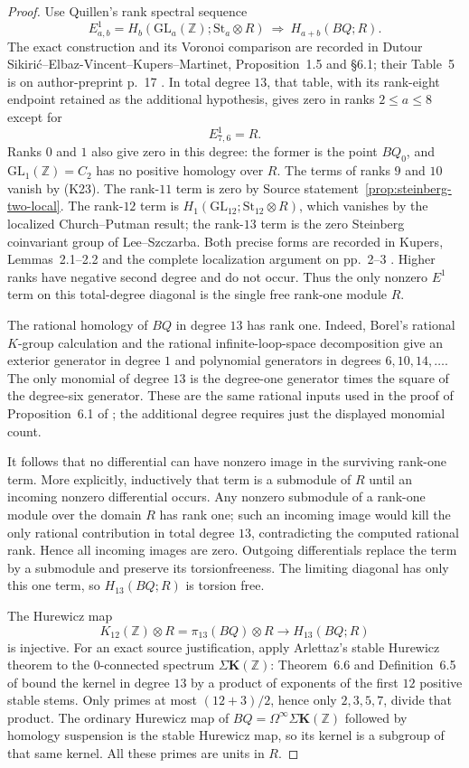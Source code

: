 \documentclass[11pt,a4paper]{article}
\theoremstyle{definition}
\begin{document}
\begin{proof}
Use Quillen's rank spectral sequence
\[
 E^1_{a,b}=H_b(\mathrm{GL}_a(\mathbb Z);\mathrm{St}_a\otimes R)
 \ \Longrightarrow\ H_{a+b}(BQ;R).
\]
The exact construction and its Voronoi comparison are recorded in
Dutour Sikiri\'c--Elbaz-Vincent--Kupers--Martinet,
Proposition~1.5 and \S6.1; their Table~5 is on author-preprint p.~17
\cite{DEKM2026}. In total degree $13$, that table, with its rank-eight endpoint retained
as the additional hypothesis, gives zero in ranks $2\le a\le8$ except for
\[
 E^1_{7,6}=R.
\]
Ranks $0$ and $1$ also give zero in this degree: the former is the
point $BQ_0$, and $\mathrm{GL}_1(\mathbb Z)=C_2$ has no positive
homology over $R$. The terms of ranks $9$ and $10$ vanish by (K23). The rank-$11$
term is zero by Source statement~\ref{prop:steinberg-two-local}.
The rank-$12$ term is $H_1(\mathrm{GL}_{12};\mathrm{St}_{12}\otimes R)$,
which vanishes by the localized Church--Putman result; the rank-$13$
term is the zero Steinberg coinvariant group of Lee--Szczarba.
Both precise forms are recorded in Kupers, Lemmas~2.1--2.2 and the
complete localization argument on pp.~2--3
\cite{Kupers2019}. Higher ranks have negative second degree and do
not occur. Thus the only nonzero $E^1$ term on this total-degree
diagonal is the single free rank-one module $R$.

The rational homology of $BQ$ in degree $13$ has rank one.
Indeed, Borel's rational $K$-group calculation and the rational
infinite-loop-space decomposition give an exterior generator in
degree $1$ and polynomial generators in degrees $6,10,14,\ldots$.
The only monomial of degree $13$ is the degree-one generator times
the square of the degree-six generator. These are the same rational
inputs used in the proof of Proposition~6.1 of
\cite{DEKM2026}; the additional degree requires just the
displayed monomial count.

It follows that no differential can have nonzero image in the
surviving rank-one term. More explicitly, inductively that term is
a submodule of $R$ until an incoming nonzero differential occurs.
Any nonzero submodule of a rank-one module over the domain $R$ has
rank one; such an incoming image would kill the only rational
contribution in total degree $13$, contradicting the computed
rational rank. Hence all incoming images are zero. Outgoing
differentials replace the term by a submodule and preserve its
torsionfreeness. The limiting diagonal has only this one term, so
$H_{13}(BQ;R)$ is torsion free.

The Hurewicz map
\[
 K_{12}(\mathbb Z)\otimes R
   =\pi_{13}(BQ)\otimes R\longrightarrow H_{13}(BQ;R)
\]
is injective. For an exact source justification, apply Arlettaz's
stable Hurewicz theorem to the $0$-connected spectrum
$\Sigma\mathbf K(\mathbb Z)$: Theorem~6.6 and Definition~6.5 of
\cite[pp.~40--42]{Arlettaz2000} bound the kernel in degree $13$
by a product of exponents of the first $12$ positive stable stems.
Only primes at most $(12+3)/2$, hence only $2,3,5,7$, divide that
product. The ordinary Hurewicz map of
$BQ=\Omega^\infty\Sigma\mathbf K(\mathbb Z)$ followed by homology
suspension is the stable Hurewicz map, so its kernel is a subgroup
of that same kernel. All these primes are units in $R$.


\end{proof}
\end{document}
